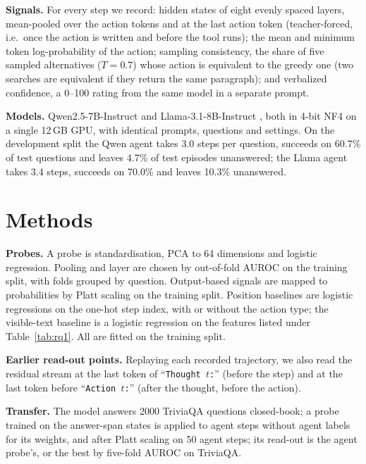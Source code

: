 \documentclass[11pt]{article}
\begin{document}
\textbf{Signals.} For every step we record: hidden states of eight evenly spaced layers, mean-pooled over the
action tokens and at the last action token (teacher-forced, i.e.\ once the action is written and before the tool
runs); the mean and minimum token log-probability of the action; sampling consistency, the share of five sampled
alternatives ($T=0.7$) whose action is equivalent to the greedy one (two searches are equivalent if they return the
same paragraph); and verbalized confidence, a 0--100 rating from the same model in a separate prompt.

\textbf{Models.} Qwen2.5-7B-Instruct \citep{qwen2024qwen25} and Llama-3.1-8B-Instruct \citep{grattafiori2024llama3},
both in 4-bit NF4 on a single 12\,GB GPU, with identical prompts, questions and settings. On the development
split the Qwen agent takes 3.0 steps per question, succeeds on 60.7\% of test questions and leaves 4.7\% of test
episodes unanswered; the Llama agent takes 3.4 steps, succeeds on 70.0\% and leaves 10.3\% unanswered.

\section{Methods}
\textbf{Probes.} A probe is standardisation, PCA to 64 dimensions and logistic regression. Pooling and layer are
chosen by out-of-fold AUROC on the training split, with folds grouped by question. Output-based signals are mapped
to probabilities by Platt scaling \citep{platt1999probabilistic} on the training split. Position baselines are
logistic regressions on the one-hot step index, with or without the action type; the visible-text baseline is a
logistic regression on the features listed under Table~\ref{tab:rq1}. All are fitted on the training split.

\textbf{Earlier read-out points.} Replaying each recorded trajectory, we also read the residual stream at the last
token of ``\texttt{Thought $t$:}'' (before the step) and at the last token before ``\texttt{Action $t$:}''
(after the thought, before the action).

\textbf{Transfer.} The model answers 2000 TriviaQA questions \citep{joshi2017triviaqa} closed-book; a probe trained
on the answer-span states is applied to agent steps without agent labels for its weights, and after Platt scaling
on 50 agent steps; its read-out is the agent probe's, or the best by five-fold AUROC on TriviaQA.
\end{document}
